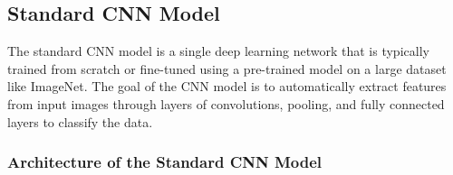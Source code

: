 \documentclass{article}
\begin{document}
\subsection{Standard CNN Model}

The standard CNN model is a single deep learning network that is typically trained from scratch or fine-tuned using a pre-trained model on a large dataset like ImageNet. The goal of the CNN model is to automatically extract features from input images through layers of convolutions, pooling, and fully connected layers to classify the data.

\subsubsection{Architecture of the Standard CNN Model}
\end{document}
